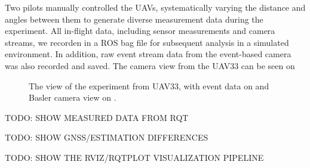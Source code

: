 Two pilots manually controlled the \ac{UAV}s, systematically varying the distance and angles between them to generate diverse measurement data during the experiment. All in-flight data, including sensor measurements and camera streams, we recorden in a \ac{ROS} bag file for subsequent analysis
in a simulated environment. In addition, raw event stream data from the event-based camera was also recorded and saved. The camera view from the UAV33
can be seen on 

\begin{figure}[H]
	\centering
	\caption{
		The view of the experiment from UAV33, with event data on  and Basler camera view on .
  }
	\label{fig:exp1}
\end{figure}

TODO: SHOW MEASURED DATA FROM RQT

TODO: SHOW GNSS/ESTIMATION DIFFERENCES

TODO: SHOW THE RVIZ/RQTPLOT VISUALIZATION PIPELINE